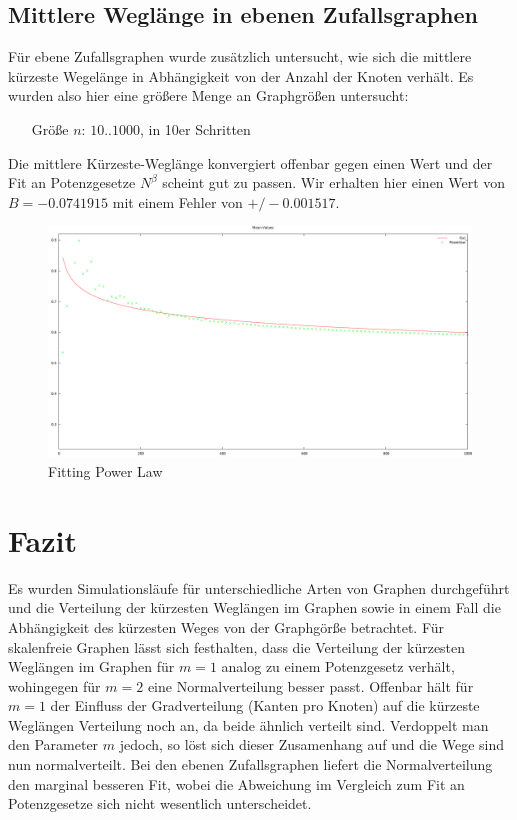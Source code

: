 \documentclass[10pt]{article}
\begin{document}
\subsection{Mittlere Weglänge in ebenen Zufallsgraphen}
Für ebene Zufallsgraphen wurde zusätzlich untersucht, wie sich die mittlere kürzeste Wegelänge in Abhängigkeit von der Anzahl der Knoten verhält. Es wurden also hier eine größere Menge an Graphgrößen untersucht:
\begin{itemize}
\item[\quad Größe $n$:] $10..1000$, in 10er Schritten
\end{itemize}
Die mittlere Kürzeste-Weglänge konvergiert offenbar gegen einen Wert und der Fit an Potenzgesetze $N^\beta$ scheint gut zu passen. Wir erhalten hier einen Wert von $B= -0.0741915$ mit einem Fehler von $+/- 0.001517$.
\begin{figure}[!htb]
  \centering
  \includegraphics[width=\linewidth]{../Results/Power_PlanarMean.png}
  \caption{Fitting Power Law}
\label{fig:planarMean}
\end{figure}

\section{Fazit}
Es wurden Simulationsläufe für unterschiedliche Arten von Graphen durchgeführt und die Verteilung der kürzesten Weglängen im Graphen sowie in einem Fall die Abhängigkeit des kürzesten Weges von der Graphgörße betrachtet. Für skalenfreie Graphen lässt sich festhalten, dass die Verteilung der kürzesten Weglängen im Graphen für $m=1$ analog zu einem Potenzgesetz verhält, wohingegen für $m=2$ eine Normalverteilung besser passt. Offenbar hält für $m=1$ der Einfluss der Gradverteilung (Kanten pro Knoten) auf die kürzeste Weglängen Verteilung noch an, da beide ähnlich verteilt sind. Verdoppelt man den Parameter $m$ jedoch, so löst sich dieser Zusamenhang auf und die Wege sind nun normalverteilt. Bei den ebenen Zufallsgraphen liefert die Normalverteilung den marginal besseren Fit, wobei die Abweichung im Vergleich zum Fit an Potenzgesetze sich nicht wesentlich unterscheidet.

\newpage

 

\end{document}

